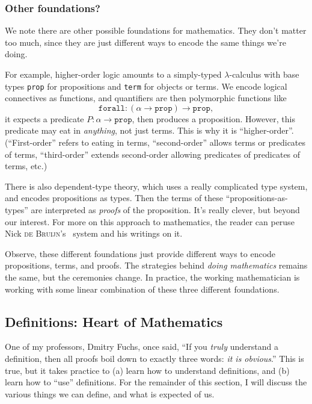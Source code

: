 \subsubsection{Other foundations?}
We note there are other possible foundations for mathematics. They don't
matter too much, since they are just different ways to encode the same
things we're doing.

For example, higher-order logic amounts to a simply-typed $\lambda$-calculus
with base types \texttt{prop} for propositions and \texttt{term} for
objects or terms. We encode logical connectives as functions, and
quantifiers are then polymorphic functions like
\begin{equation}
\mathtt{forall}{:}(\alpha\to\mathtt{prop})\to\mathtt{prop},
\end{equation}
it expects a predicate $P{:}\alpha\to\mathtt{prop}$, then produces a
proposition. However, this predicate may eat in \emph{anything}, not
just terms. This is why it is ``higher-order''. (``First-order'' refers
to eating in terms, ``second-order'' allows terms or predicates of
terms, ``third-order'' extends second-order allowing predicates of
predicates of terms, etc.)

There is also dependent-type theory, which uses a really complicated
type system, and encodes propositions as types. Then the terms of these
``propositions-as-types'' are interpreted as \emph{proofs} of the
proposition. It's really clever, but beyond our interest. For more on
this approach to mathematics, the reader can peruse Nick \textsc{de Bruijn}'s
\Automath\ system and his writings on it.

Observe, these different foundations just provide different ways to
encode propositions, terms, and proofs. The strategies behind
\emph{doing mathematics} remains the same, but the ceremonies change.
In practice, the working mathematician is working with some linear
combination of these three different foundations.

\subsection{Definitions: Heart of Mathematics}
One of my professors, Dmitry Fuchs, once said, ``If you \emph{truly}
understand a definition, then all proofs boil down to exactly three
words: \emph{it is obvious\/}.'' This is true, but it takes practice to
(a) learn how to understand definitions, and (b) learn how to ``use''
definitions. For the remainder of this section, I will discuss the
various things we can define, and what is expected of us.

